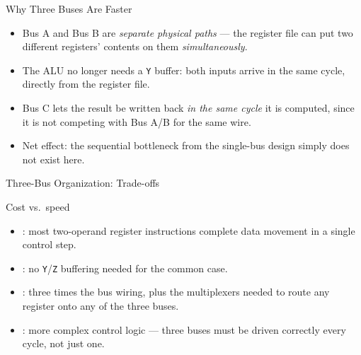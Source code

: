 \documentclass[aspectratio=169]{beamer}
\begin{document}
\begin{frame}{Why Three Buses Are Faster}
  \begin{itemize}
    \item Bus A and Bus B are \emph{separate physical paths} --- the register file
      can put two different registers' contents on them \emph{simultaneously}.
    \item The ALU no longer needs a \texttt{Y} buffer: both inputs arrive in the
      same cycle, directly from the register file.
    \item Bus C lets the result be written back \emph{in the same cycle} it is
      computed, since it is not competing with Bus A/B for the same wire.
    \item Net effect: the sequential bottleneck from the single-bus design simply
      does not exist here.
  \end{itemize}
\end{frame}

\begin{frame}{Three-Bus Organization: Trade-offs}
  \begin{block}{Cost vs.\ speed}
    \begin{itemize}
      \item {}: most two-operand register instructions complete data
        movement in a single control step.
      \item {}: no \texttt{Y}/\texttt{Z} buffering needed for the common case.
      \item {}: three times the bus wiring, plus the multiplexers needed to
        route any register onto any of the three buses.
      \item {}: more complex control logic --- three buses must be driven
        correctly every cycle, not just one.
    \end{itemize}
  \end{block}
\end{frame}
\end{document}
